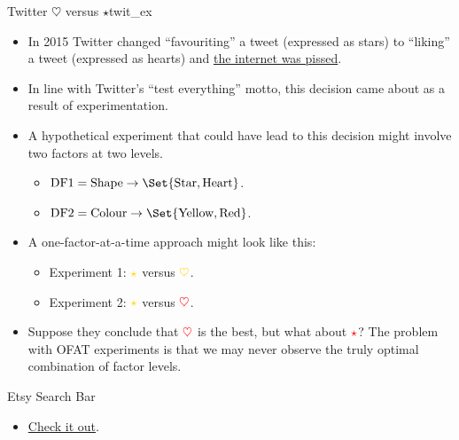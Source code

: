 \begin{Example}{Twitter $ \heartsuit $ versus $ \star $}{twit_ex}
      \begin{itemize}
            \item In 2015 Twitter changed ``favouriting'' a tweet (expressed as stars) to ``liking'' a tweet (expressed
                  as hearts) and \href{https://entertainment.ie/trending/twitter-changed-their-star-favourites-to-heart-likes-and-the-internet-is-pissed-335920/}{the internet was pissed}.
            \item In line with Twitter's ``test everything'' motto, this decision came about as a result of experimentation.
            \item A hypothetical experiment that could have lead to this decision might involve two factors at two levels.
                  \begin{itemize}
                        \item $ \text{DF1}=\text{Shape}\to\Set{\text{Star},\text{Heart}} $.
                        \item $ \text{DF2}=\text{Colour}\to\Set{\text{Yellow},\text{Red}} $.
                  \end{itemize}
            \item A one-factor-at-a-time approach might look like this:
                  \begin{itemize}
                        \item Experiment 1: $ \color{Gold}\star $ versus $ \color{Gold}\heartsuit $.
                        \item Experiment 2: $ \color{Gold}\star $ versus $ \color{Red}\heartsuit $.
                  \end{itemize}
            \item Suppose they conclude that $ \color{Red}\heartsuit $ is the best, but what about $ \color{Red}\star $?
                  The problem with OFAT experiments is that we may never observe the truly optimal combination of factor levels.
      \end{itemize}
\end{Example}
\begin{Example}{Etsy Search Bar}{}
      \begin{itemize}
            \item \href{https://goodui.org/leaks/how-etsys-product-page-design-evolved-between-2019-and-2020/}{Check it out}.
      \end{itemize}
\end{Example}
